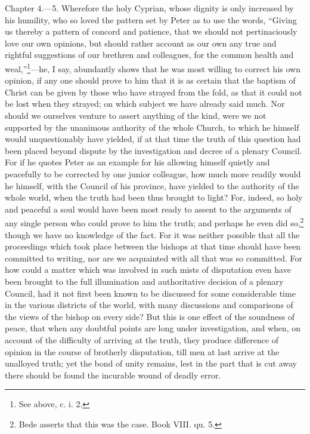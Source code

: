 Chapter 4.—5. Wherefore the holy Cyprian, whose dignity is only increased by his humility, who so loved the pattern set by Peter as to use the words, ``Giving us thereby a pattern of concord and patience, that we should not pertinaciously love our own opinions, but should rather account as our own any true and rightful suggestions of our brethren and colleagues, for the common health and weal,''\footnote{\par  See above, c. i. 2.}—he, I say, abundantly shows that he was most willing to correct his own opinion, if any one should prove to him that it is as certain that the baptism of Christ can be given by those who have strayed from the fold, as that it could not be lost when they strayed; on which subject we have already said much. Nor should we ourselves venture to assert anything of the kind, were we not supported by the unanimous authority of the whole Church, to which he himself would unquestionably have yielded, if at that time the truth of this question had been placed beyond dispute by the investigation and decree of a plenary Council. For if he quotes Peter as an example for his allowing himself quietly and peacefully to be corrected by one junior colleague, how much more readily would he himself, with the Council of his province, have yielded to the authority of the whole world, when the truth had been thus brought to light? For, indeed, so holy and peaceful a soul would have been most ready to assent to the arguments of any single person who could prove to him the truth; and perhaps he even did so,\footnote{\par  Bede asserts that this was the case. Book VIII. qu. 5.} though we have no knowledge of the fact. For it was neither possible that all the proceedings which took place between the bishops at that time should have been committed to writing, nor are we acquainted with all that was so committed. For how could a matter which was involved in such mists of disputation even have been brought to the full illumination and authoritative decision of a plenary Council, had it not first been known to be discussed for some considerable time in the various districts of the world, with many discussions and comparisons of the views of the bishop on every side? But this is one effect of the soundness of peace, that when any doubtful points are long under investigation, and when, on account of the difficulty of arriving at the truth, they produce difference of opinion in the course of brotherly disputation, till men at last arrive at the unalloyed truth; yet the bond of unity remains, lest in the part that is cut away there should be found the incurable wound of deadly error.

